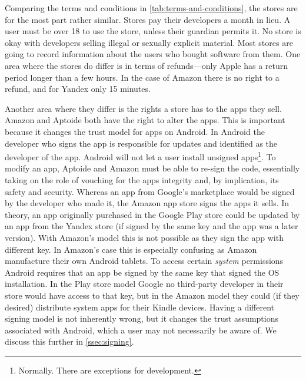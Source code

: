 \documentclass[thesis.tex]{subfiles}
\begin{document}
Comparing the terms and conditions in
\autoref{tab:terms-and-conditions}, the stores are for the most part
rather similar.  Stores pay their developers a month in lieu.  A user
must be over 18 to use the store, unless their guardian permits it.
No store is okay with developers selling illegal or sexually explicit
material.  Most stores are going to record information about the
users who bought software from them.  One area where the stores do
differ is in terms of refunds---only Apple has a return period longer
than a few hours.  In the case of Amazon there is no right to a
refund, and for Yandex only 15 minutes.

Another area where they differ is the rights a store has to the apps they sell.
Amazon and Aptoide both have the right to alter the apps. This is important
because it changes the trust model for apps on Android. In Android the developer
who signs the app is responsible for updates and identified as the developer of
the app. Android will not let a user install unsigned apps\footnote{Normally.
There are exceptions for development.}. To modify an app, Aptoide and Amazon
must be able to re-sign the code, essentially taking on the role of vouching for
the apps integrity and, by implication, its safety and security. Whereas an app
from Google's marketplace would be signed by the developer who made it, the
Amazon app store signs the apps it sells. In theory, an app originally purchased
in the Google Play store could be updated by an app from the Yandex store (if
signed by the same key and the app was a later version). With Amazon's model
this is not possible as they sign the app with different key. In Amazon's case
this is especially confusing as Amazon manufacture their own Android tablets. To
access certain \emph{system} permissions Android requires that an app be signed
by the same key that signed the OS installation. In the Play store model Google
no third-party developer in their store would have access to that key, but in
the Amazon model they could (if they desired) distribute system apps for their
Kindle devices. Having a different signing model is not inherently wrong, but it
changes the trust assumptions associated with Android, which a user may not
necessarily be aware of. We discuss this further in \autoref{ssec:signing}.

\end{document}
